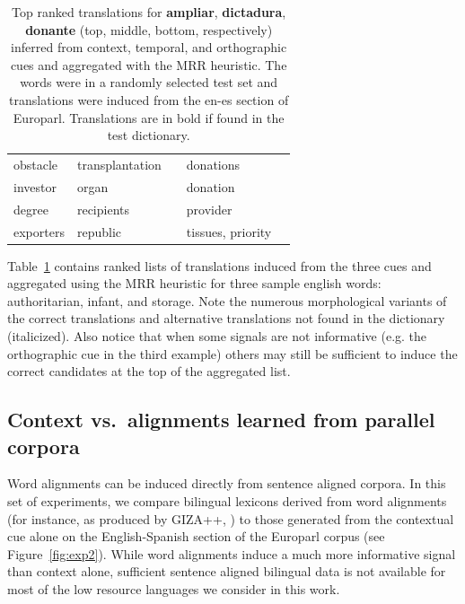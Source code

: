 \documentclass{article}
\newcommand{\tabref}[1]{Table~\ref{#1}}
\newcommand{\figref}[1]{Figure~\ref{#1}}
\begin{document}
\begin{table}[h!]
\begin{center}
\begin{tabular}{lllll}
obstacle	&	transplantation	&	  	&	donations\\
investor	&	organ	&	  	&	donation\\
degree	&	recipients	&	  	&	provider\\
exporters	&	republic	&	  	&	tissues, priority\\
\end{tabular}
\end{center}
\normalsize
\caption{Top ranked translations for {\bf ampliar}, {\bf dictadura}, {\bf donante} (top, middle, bottom, respectively) inferred from context, temporal, and orthographic cues and aggregated with the MRR heuristic.  The words were in a randomly selected test set and translations were induced from the en-es section of Europarl. Translations are in bold if found in the test dictionary.}
\label{fig:examplelists}
\end{table}

\tabref{fig:examplelists} contains ranked lists of translations induced from the three cues and aggregated using the MRR heuristic for three sample english words: authoritarian, infant, and storage.  Note the numerous morphological variants of the correct translations and alternative translations not found in the dictionary (italicized).  Also notice that when some signals are not informative (e.g. the orthographic cue in the third example) others may still be sufficient to induce the correct candidates at the top of the aggregated list.

\subsection{Context vs.\ alignments learned from parallel corpora} 

Word alignments can be induced directly from sentence aligned corpora.  In this set of experiments, we compare bilingual lexicons derived from word alignments (for instance, as produced by GIZA++, \cite{Och:2003}) to those generated from the contextual cue alone on the English-Spanish section of the Europarl corpus (see \figref{fig:exp2}). While word alignments induce a much more informative signal than context alone, sufficient sentence aligned bilingual data is not available for most of the low resource languages we consider in this work.\\
\end{document}
